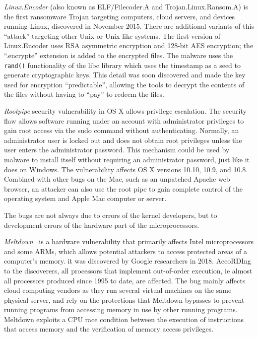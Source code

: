 \documentclass{masterthesis}
\begin{document}
\emph{Linux.Encoder} (also known as ELF/Filecoder.A and Trojan.Linux.Ransom.A) is the first ransomware Trojan targeting computers, cloud servers, and devices running Linux, discovered in November 2015. There are additional variants of this ``attack'' targeting other Unix or Unix-like systems.
The first version of Linux.Encoder uses RSA asymmetric encryption and 128-bit AES encryption; the ``.encrypte'' extension is added to the encrypted files.
The malware uses the \texttt{rand()} functionality of the libc library which uses the timestamp as a seed to generate cryptographic keys.
This detail was soon discovered and made the key used for encryption ``predictable'', allowing the tools to decrypt the contents of the files without having to ``pay'' to redeem the files.

\emph{Rootpipe} security vulnerability in OS X allows privilege escalation.
The security flaw allows software running under an account with administrator privileges to gain root access via the sudo command without authenticating. Normally, an administrator user is locked out and does not obtain root privileges unless the user enters the administrator password.
This mechanism could be used by malware to install itself without requiring an administrator password, just like it does on Windows. The vulnerability affects OS X versions 10.10, 10.9, and 10.8.
Combined with other bugs on the Mac, such as an unpatched Apache web browser, an attacker can also use the root pipe to gain complete control of the operating system and Apple Mac computer or server.

The bugs are not always due to errors of the kernel developers, but to development errors of the hardware part of the microprocessors.

\emph{Meltdown}~\cite{lipp2018meltdown} is a hardware vulnerability that primarily affects Intel microprocessors and some ARMs, which allows potential attackers to access protected areas of a computer's memory.
it was discovered by Google researchers in 2018. AccoRDIng to the discoverers, all processors that implement out-of-order execution, ie almost all processors produced since 1995 to date, are affected.
The bug mainly affects cloud computing vendors as they run several virtual machines on the same physical server, and rely on the protections that Meltdown bypasses to prevent running programs from accessing memory in use by other running programs.
Meltdown exploits a CPU race condition between the execution of instructions that access memory and the verification of memory access privileges.
\end{document}
